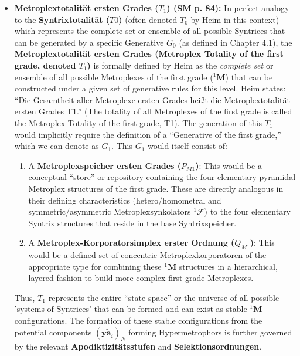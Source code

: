 \documentclass[12pt]{article}
\newcommand{\q}[1]{\enquote{#1}}
\newcommand{\syntrix}{\bm{y\widetilde{a}}}
\newcommand{\syntrixtotalitaet}{T0}
\newcommand{\generative}{G}
\newcommand{\metroplex}[1]{{}^{#1}\mathbf{M}}
\newcommand{\hypersyntrix}{\metroplex{1}}
\newcommand{\metroplexsynkolator}[1]{{}^{#1}\mathcal{F}}
\newcommand{\metroplextotalitaet}[1]{T_{#1}}
\begin{document}
\begin{itemize}
    \item \textbf{Metroplextotalität ersten Grades (\( \metroplextotalitaet{1} \)) (SM p. 84):}
    In perfect analogy to the \textbf{Syntrixtotalität (\( \syntrixtotalitaet \))} (often denoted \(T_0\) by Heim in this context) which represents the complete set or ensemble of all possible Syntrices that can be generated by a specific Generative \( \generative_0 \) (as defined in Chapter 4.1), the \textbf{Metroplextotalität ersten Grades (Metroplex Totality of the first grade, denoted \( \metroplextotalitaet{1} \))} is formally defined by Heim as the \textit{complete set} or ensemble of all possible Metroplexes of the first grade (\( \hypersyntrix \)) that can be constructed under a given set of generative rules for this level. Heim states: \q{Die Gesamtheit aller Metroplexe ersten Grades heißt die Metroplextotalität ersten Grades T1.} (The totality of all Metroplexes of the first grade is called the Metroplex Totality of the first grade, T1).
    The generation of this \( \metroplextotalitaet{1} \) would implicitly require the definition of a \q{Generative of the first grade,} which we can denote as \( \generative_1 \). This \( \generative_1 \) would itself consist of:
    \begin{enumerate}
        \item A \textbf{Metroplexspeicher ersten Grades (\( P_{M1} \))}: This would be a conceptual \q{store} or repository containing the four elementary pyramidal Metroplex structures of the first grade. These are directly analogous in their defining characteristics (hetero/homometral and symmetric/asymmetric Metroplexsynkolators \( \metroplexsynkolator{1} \)) to the four elementary Syntrix structures that reside in the base Syntrixspeicher.
        \item A \textbf{Metroplex-Korporatorsimplex erster Ordnung (\( Q_{M1} \))}: This would be a defined set of concentric Metroplexkorporatoren of the appropriate type for combining these \( \hypersyntrix \) structures in a hierarchical, layered fashion to build more complex first-grade Metroplexes.
    \end{enumerate}
    Thus, \( \metroplextotalitaet{1} \) represents the entire \q{state space} or the universe of all possible 'systems of Syntrices' that can be formed and can exist as stable \( \hypersyntrix \) configurations. The formation of these stable configurations from the potential components \( (\syntrix_i)_N \) forming Hypermetrophors is further governed by the relevant \textbf{Apodiktizitätsstufen} and \textbf{Selektionsordnungen}.


\end{itemize}
\end{document}
